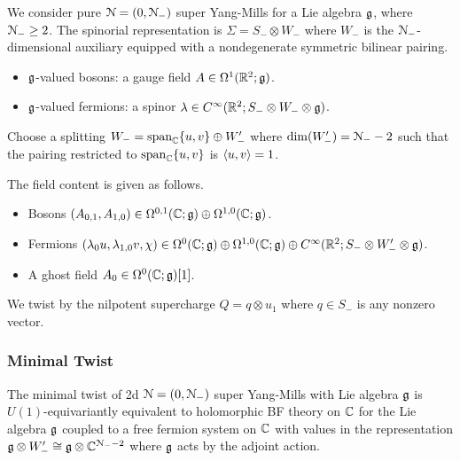 \documentclass[10pt, oneside]{article}
\begin{document}
We consider pure $\mathcal N=(0,\mathcal N_-)$ super Yang-Mills for a Lie algebra $\mathfrak g$, where $\mathcal N_- \geq 2$.
The spinorial representation is $\Sigma = S_- \otimes W_-$ where $W_-$ is the $\mathcal N_-$-dimensional auxiliary equipped with a nondegenerate symmetric bilinear pairing.

\begin{itemize}
\item $\mathfrak g$-valued bosons: a gauge field $A \in \Omega^1(\mathbb R^2;\mathfrak g)$.
\item $\mathfrak g$-valued fermions: a spinor $\lambda \in C^\infty(\mathbb R^2 ; S_- \otimes W_- \otimes \mathfrak g)$. 
\end{itemize}
Choose a splitting $W_- = {\rm span}_{\mathbb C} \{u, v\} \oplus W_-'$ where $\dim(W_-') = \mathcal N_- - 2$ such that the pairing restricted to $ {\rm span}_{\mathbb C} \{u, v\}$ is $\langle u,v\rangle = 1$. 

The field content is given as follows.
\begin{itemize}
 \item Bosons $(A_{0,1}, A_{1,0}) \in \Omega^{0,1}(\mathbb C ; \mathfrak g) \oplus \Omega^{1,0}(\mathbb C ; \mathfrak g)$.
 \item Fermions $(\lambda_{0} u, \lambda_{1,0} v, \chi) \in \Omega^{0}(\mathbb C ; \mathfrak g) \oplus \Omega^{1,0}(\mathbb C ; \mathfrak g) \oplus C^\infty(\mathbb R^2 ; S_- \otimes W_-' \otimes \mathfrak g)$.
 \item A ghost field $A_{0} \in \Omega^0(\mathbb C ; \mathfrak g)[1]$.
\end{itemize}

We twist by the nilpotent supercharge $Q = q \otimes u_1$ where $q \in S_-$ is any nonzero vector. 

\subsubsection{Minimal Twist} \label{sect:2d0Nminimaltwist}

\begin{theorem}
The minimal twist of 2d $\mathcal N=(0,\mathcal N_-)$ super Yang-Mills with Lie algebra $\mathfrak g$ is $U(1)$-equivariantly equivalent to holomorphic BF theory on $\mathbb C$ for the Lie algebra $\mathfrak g$ coupled to a free fermion system on $\mathbb C$ with values in the representation $\mathfrak g \otimes W_-' \cong \mathfrak g \otimes \mathbb C^{\mathcal N_- - 2}$ where $\mathfrak g$ acts by the adjoint action. 
\end{theorem}
\end{document}

